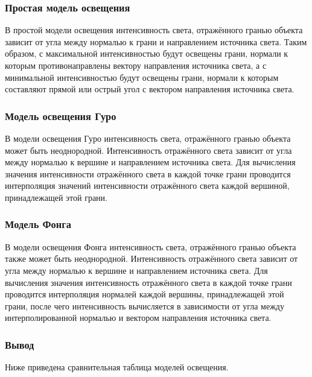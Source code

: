 \subsubsection{Простая модель освещения}

В простой модели освещения интенсивность света, отражённого гранью объекта зависит от угла между нормалью к грани и направлением источника света.
Таким образом, с максимальной интенсивностью будут освещены грани, нормали к которым противонаправлены вектору направления источника света, а с минимальной интенсивностью будут освещены грани, нормали к которым составляют прямой или острый угол с вектором направления источника света.

\subsubsection{Модель освещения Гуро}

В модели освещения Гуро интенсивность света, отражённого гранью объекта может быть неоднородной.
Интенсивность отражённого света зависит от угла между нормалью к вершине и направлением источника света.
Для вычисления значения интенсивности отражённого света в каждой точке грани проводится интерполяция значений интенсивности отражённого света каждой вершиной, принадлежащей этой грани.

\subsubsection{Модель Фонга}

В модели освещения Фонга интенсивность света, отражённого гранью объекта также может быть неоднородной.
Интенсивность отражённого света зависит от угла между нормалью к вершине и направлением источника света.
Для вычисления значения интенсивность отражённого света в каждой точке грани проводится интерполяция нормалей каждой вершины, принадлежащей этой грани, после чего интенсивность вычисляется в зависимости от угла между интерполированной нормалью и вектором направления источника света.

\subsubsection*{Вывод}

Ниже приведена сравнительная таблица моделей освещения.

